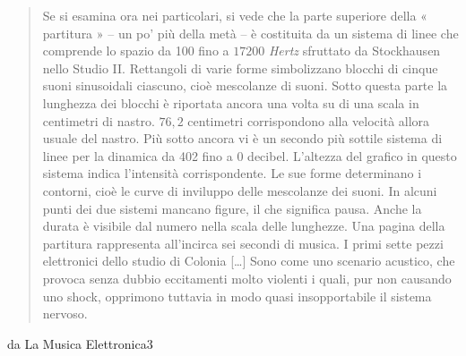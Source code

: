 \begin{quote}
Se si esamina ora nei particolari, si vede che la parte superiore della « partitura » – un po’ più della metà – è costituita da un sistema di linee che comprende lo spazio da 100 fino a $ 17200 $ \emph{Hertz} sfruttato da Stockhausen nello Studio II. Rettangoli di varie forme simbolizzano blocchi di cinque suoni sinusoidali ciascuno, cioè mescolanze di suoni. Sotto questa parte la lunghezza dei blocchi è riportata ancora una volta su di una scala in centimetri di nastro. $ 76,2 $ centimetri corrispondono alla velocità allora usuale del nastro. Più sotto ancora vi è un secondo più sottile sistema di linee per la dinamica da 402 fino a 0 decibel. L’altezza del grafico in questo sistema indica l’intensità corrispondente. Le sue forme determinano i contorni, cioè le curve di inviluppo delle mescolanze dei suoni. In alcuni punti dei due sistemi mancano figure, il che significa pausa. Anche la durata è visibile dal numero nella scala delle lunghezze. Una pagina della partitura rappresenta all’incirca sei secondi di musica.
I primi sette pezzi elettronici dello studio di Colonia [\ldots] Sono come uno scenario acustico, che provoca senza dubbio eccitamenti molto violenti i quali, pur non causando uno shock, opprimono tuttavia in modo quasi insopportabile il sistema nervoso.
\end{quote}




da La Musica Elettronica3


